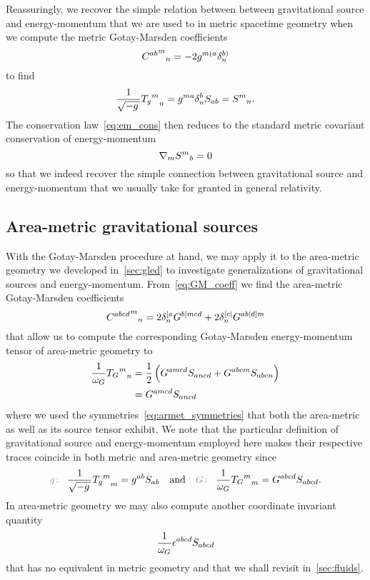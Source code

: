 Reassuringly, we recover the simple relation between between gravitational source and energy-momentum that we are used to in metric spacetime geometry when we compute the metric Gotay-Marsden coefficients
\begin{equation}
	{{C^{ab}}^{m}}_{n}=-2g^{m( a}\delta^{b)}_n
\end{equation}
to find
\begin{equation}
	\frac{1}{\sqrt{-g\,}}{{T_g}^m}_n=g^{ma}\delta^b_nS_{ab}={S^m}_n
	\mathpunct{.}
\end{equation}
The conservation law~\eqref{eq:em_cons} then reduces to the standard metric covariant conservation of energy-momentum
\begin{equation}
	\nabla_m{S^m}_b=0
\end{equation}
so that we indeed recover the simple connection between gravitational source and energy-momentum that we usually take for granted in general relativity.

\subsection{Area-metric gravitational sources}

With the Gotay-Marsden procedure at hand, we may apply it to the area-metric geometry we developed in~\autoref{sec:gled} to investigate generalizations of gravitational sources and energy-momentum. From~\eqref{eq:GM_coeff} we find the area-metric Gotay-Marsden coefficients
\begin{equation}
	{{C^{abcd}}^{m}}_{n}=2\delta^{[ a}_nG^{b] mcd}+2\delta^{[ c|}_nG^{ab| d] m}
\end{equation}
that allow us to compute the corresponding Gotay-Marsden energy-momentum tensor of area-metric geometry to
\begin{align}
	\frac{1}{\omega_G}{{T_G}^m}_n&=\frac{1}{2}\left(G^{amcd}S_{ancd}+G^{abcm}S_{abcn}\right)\\
	&=G^{amcd}S_{ancd}\label{eq:emt_armet}
\end{align}
where we used the symmetries~\eqref{eq:armet_symmetries} that both the area-metric as well as its source tensor exhibit. We note that the particular definition of gravitational source and energy-momentum employed here makes their respective traces coincide in both metric and area-metric geometry since
\begin{equation}\label{eq:emtrace}
	\metind\frac{1}{\sqrtmet}{{\EMt_\met}^m}_m=\met^{ab}\sourcet_{ab} \quad \text{and} \quad \armetind\frac{1}{\volel_\armet}{{\EMt_\armet}^m}_m=\armet^{abcd}\sourcet_{abcd}
	\eqpunct{.}
\end{equation}
In area-metric geometry we may also compute another coordinate invariant quantity
\begin{equation}\label{eq:sourcet_gled_levciv}
	\frac{1}{\omega_G}\epsilon^{abcd}S_{abcd}
\end{equation}
that has no equivalent in metric geometry and that we shall revisit in~\autoref{sec:fluids}.

